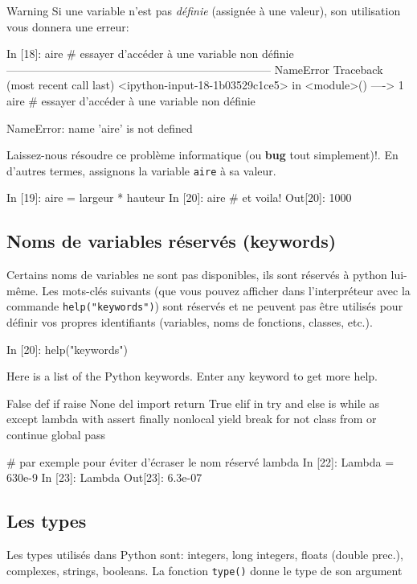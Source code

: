 \documentclass[%
oneside,                 %
final,                   %
10pt]{article}
\begin{document}
\begin{block}{Warning}
Si une variable n'est pas \emph{définie} (assignée à une valeur), son utilisation vous donnera une erreur:

\bipy
In [18]: aire     # essayer d'accéder à une variable non définie
-----------------------------------------------------------------------
NameError                            Traceback (most recent call last)
<ipython-input-18-1b03529c1ce5> in <module>()
----> 1 aire     # essayer d'accéder à une variable non définie

NameError: name 'aire' is not defined
\eipy
\end{block}

Laissez-nous résoudre ce problème informatique (ou \textbf{bug} tout simplement)!. En d'autres termes, assignons la variable \texttt{aire} à sa valeur.

\bipy
In [19]: aire = largeur * hauteur
In [20]: aire  # et voila!
Out[20]: 1000
\eipy

\subsection{Noms de variables réservés (keywords)}
Certains noms de variables ne sont pas disponibles, ils sont réservés à python lui-même. Les mots-clés suivants (que vous pouvez afficher dans l'interpréteur avec la commande \texttt{help("keywords")}) sont réservés et ne peuvent pas être utilisés pour définir vos propres identifiants (variables, noms de fonctions, classes, etc.).

\bipy
In [20]: help("keywords")

Here is a list of the Python keywords.  Enter any keyword to get more help.

False               def                 if                  raise
None                del                 import              return
True                elif                in                  try
and                 else                is                  while
as                  except              lambda              with
assert              finally             nonlocal            yield
break               for                 not
class               from                or
continue            global              pass

# par exemple pour éviter d'écraser le nom réservé lambda
In [22]: Lambda = 630e-9
In [23]: Lambda
Out[23]: 6.3e-07
\eipy

\subsection{Les types}
Les types utilisés dans Python sont: integers, long integers, floats (double prec.), complexes, strings, booleans. La fonction \texttt{type()} donne le type de son argument
\end{document}
